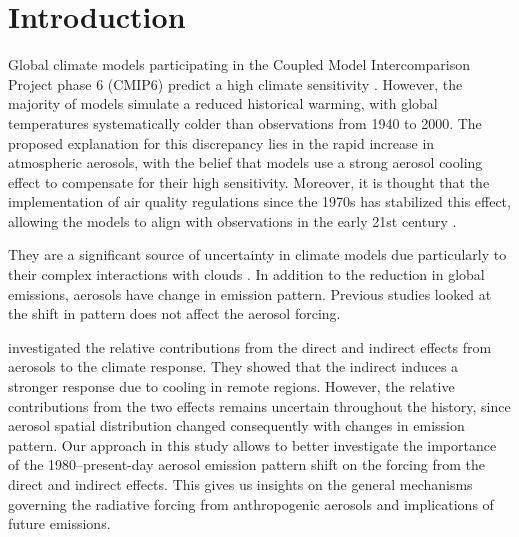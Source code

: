 \documentclass[draft]{agujournal2019}
\begin{document}
%
%
%
%


\section{Introduction}
      Global climate models participating in the Coupled Model Intercomparison Project phase 6 (CMIP6) predict a high climate sensitivity \cite{Flynn_2020}. However, the majority of models simulate a reduced historical warming, with global temperatures systematically colder than observations from 1940 to 2000. The proposed explanation for this discrepancy lies in the rapid increase in atmospheric aerosols, with the belief that models use a strong aerosol cooling effect to compensate for their high sensitivity. Moreover, it is thought that the implementation of air quality regulations since the 1970s has stabilized this effect, allowing the models to align with observations in the early 21st century \cite{Flynn_2020}. 

      They are a significant source of uncertainty in climate models due particularly to their complex interactions with clouds \cite{Bellouin_2020}. 
      In addition to the reduction in global emissions, aerosols have change in emission pattern. Previous studies looked at the shift in pattern does not affect the aerosol forcing. 
      
       investigated the relative contributions from the direct and indirect effects from aerosols to the climate response. They showed that the indirect induces a stronger response due to cooling in remote regions. However, the relative contributions from the two effects remains uncertain throughout the history, since aerosol spatial distribution changed consequently with changes in emission pattern. Our approach in this study allows to better investigate the importance of the 1980--present-day aerosol emission pattern shift on the forcing from the direct and indirect effects. This gives us insights on the general mechanisms governing the radiative forcing from anthropogenic aerosols and implications of future emissions.
\end{document}
